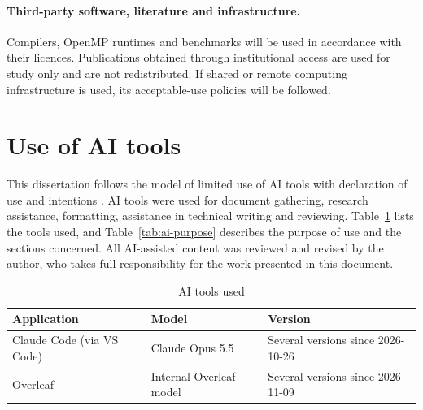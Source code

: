 \paragraph{Third-party software, literature and infrastructure.} Compilers, OpenMP runtimes and benchmarks will be used in accordance with their licences. Publications obtained through institutional access are used for study only and are not redistributed. If shared or remote computing infrastructure is used, its acceptable-use policies will be followed.


\section{Use of AI tools}
\label{sec:chap1_ai}
This dissertation follows the model of limited use of AI tools with declaration of use and intentions \parencite{oliveira2025}. AI tools were used for document gathering, research assistance, formatting, assistance in technical writing and reviewing. Table~\ref{tab:ai-tools} lists the tools used, and Table~\ref{tab:ai-purpose} describes the purpose of use and the sections concerned. All AI-assisted content was reviewed and revised by the author, who takes full responsibility for the work presented in this document.

\begin{table}[htbp]
  \centering
  \caption{AI tools used}
  \label{tab:ai-tools}
  \begin{tabularx}{\textwidth}{l l X}
    \toprule
    Application              & Model           & Version                           \\
    \midrule
    Claude Code (via VS Code) & Claude Opus 5.5 & Several versions since 2026-10-26 \\
    Overleaf & Internal Overleaf model & Several versions since 2026-11-09 \\
    \bottomrule
  \end{tabularx}
\end{table}

\pagebreak

